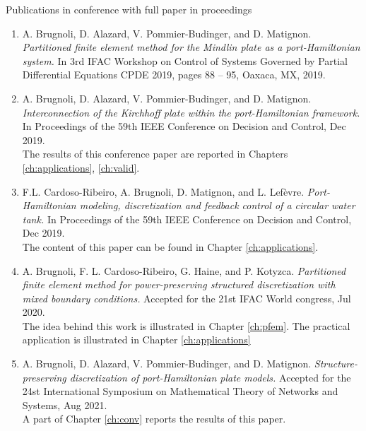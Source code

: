 Publications in conference with full paper in proceedings \cite{brugnoli2019cpde,brugnoli2019cdc,cardoso2019cdc,brugnoli2020wc,brugnoli2020mtns}
\begin{enumerate}
	\item A. Brugnoli, D. Alazard, V. Pommier-Budinger, and D. Matignon. \textit{Partitioned finite element method for the Mindlin plate as a port-Hamiltonian system.} In 3rd IFAC Workshop on Control of Systems Governed by Partial Differential Equations CPDE 2019, pages 88 – 95, Oaxaca, MX, 2019. 
	\item A. Brugnoli, D. Alazard, V. Pommier-Budinger, and D. Matignon. \textit{Interconnection of the Kirchhoff plate within the port-Hamiltonian framework.} In Proceedings of the 59th IEEE Conference on Decision and Control, Dec 2019. \\
	The results of this conference paper are reported in Chapters \ref{ch:applications}, \ref{ch:valid}.
	\item F.L. Cardoso-Ribeiro, A. Brugnoli, D. Matignon, and L. Lefèvre. \textit{Port-Hamiltonian modeling, discretization and feedback control of a circular water tank.} In Proceedings of the 59th IEEE Conference on Decision and Control, Dec 2019. \\
	The content of this paper can be found in Chapter \ref{ch:applications}.
	\item A. Brugnoli, F. L. Cardoso-Ribeiro, G. Haine, and P. Kotyzca. \textit{Partitioned finite element method for power-preserving structured discretization with mixed boundary conditions.} Accepted for the 21st IFAC World congress, Jul 2020. \\
	The idea behind this work is illustrated in Chapter \ref{ch:pfem}. The practical application is illustrated in Chapter \ref{ch:applications}
	\item A. Brugnoli, D. Alazard, V. Pommier-Budinger, and D. Matignon. \textit{Structure-preserving discretization of port-Hamiltonian plate models.} Accepted for the 24st International Symposium on Mathematical Theory of Networks and Systems, Aug 2021. \\
	A part of Chapter \ref{ch:conv} reports the results of this paper.
\end{enumerate}




